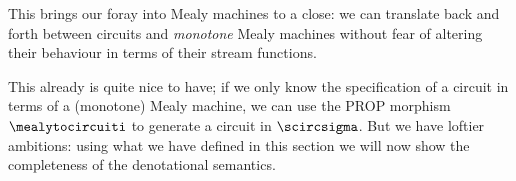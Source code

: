 This brings our foray into Mealy machines to a close: we can translate back and
forth between circuits and \emph{monotone} Mealy machines without fear of
altering their behaviour in terms of their stream functions.

This already is quite nice to have; if we only know the specification of a
circuit in terms of a (monotone) Mealy machine, we can use the PROP morphism
\(\mealytocircuiti\) to generate a circuit in \(\scircsigma\).
But we have loftier ambitions: using what we have defined in this section we
will now show the completeness of the denotational semantics.
